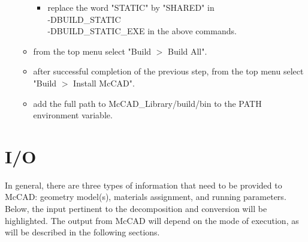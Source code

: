 \documentclass[12pt, a4paper, titlepage]{article}
\begin{document}
\begin{itemize}
\begin{itemize}
		\begin{itemize}
			\item replace the word "STATIC" by "SHARED" in \\-DBUILD\_STATIC \\-DBUILD\_STATIC\_EXE in the above commands.
		\end{itemize}
		\item from the top menu select "Build $>$ Build All".
		\item after successful completion of the previous step, from the top menu select "Build $>$ Install McCAD".
		\item add the full path to McCAD\_Library/build/bin to the PATH environment variable. 
	  \end{itemize}
    \end{itemize}

\section{I/O} \label{sec:I/O}
In general, there are three types of information that need to be provided to McCAD: geometry model(s), materials assignment, and running parameters. Below, the input pertinent to the decomposition and conversion will be highlighted. The output from McCAD will depend on the mode of execution, as will be described in the following sections.
\end{document}
